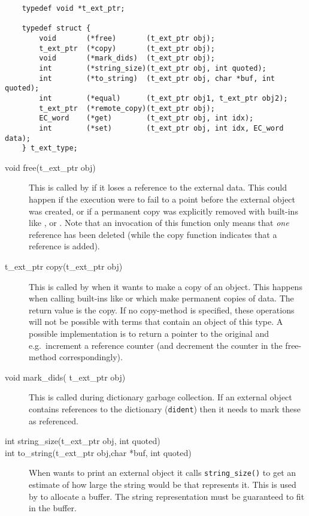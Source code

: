 \begin{verbatim}
    typedef void *t_ext_ptr;

    typedef struct {
        void       (*free)       (t_ext_ptr obj);
        t_ext_ptr  (*copy)       (t_ext_ptr obj);
        void       (*mark_dids)  (t_ext_ptr obj);
        int        (*string_size)(t_ext_ptr obj, int quoted);
        int        (*to_string)  (t_ext_ptr obj, char *buf, int quoted);
        int        (*equal)      (t_ext_ptr obj1, t_ext_ptr obj2);
        t_ext_ptr  (*remote_copy)(t_ext_ptr obj);
        EC_word    (*get)        (t_ext_ptr obj, int idx);
        int        (*set)        (t_ext_ptr obj, int idx, EC_word data);
    } t_ext_type;
\end{verbatim}

\begin{description}
\item[void free(t_ext_ptr obj)]
This is called by {\eclipse} if it loses a reference to the external
data. This could happen if the {\eclipse} execution were to fail
to a point before the external object was created, or if a
permanent copy was explicitly removed with built-ins like
,
or .
Note that an invocation of this function only means that {\em one}
reference has been deleted (while the copy function indicates that
a reference is added).

\item[t_ext_ptr copy(t_ext_ptr obj)]
This is called by {\eclipse} when it wants to make a copy of an object.
This happens when calling {\eclipse} built-ins like  or
 which make permanent copies of data. The return value is
the copy.
If no copy-method is specified, these operations will not be possible
with terms that contain an object of this type.
A possible implementation is to return a pointer to the original and
e.g.\ increment a reference counter (and decrement the counter in
the free-method correspondingly).

\item[void mark_dids( t_ext_ptr obj)]
This is called during dictionary garbage collection. If an external
object contains references to the dictionary (\verb.dident.) then
it needs to mark these as referenced.

\item[int string_size(t_ext_ptr obj, int quoted)]
\item[int to_string(t_ext_ptr obj,char *buf, int quoted)]
When {\eclipse} wants to print an external object it calls \verb.string_size().
to get an estimate of how large the string would be that represents it.
This is used by {\eclipse} to allocate a buffer. The string representation must
be guaranteed to fit in the buffer.


\end{description}
